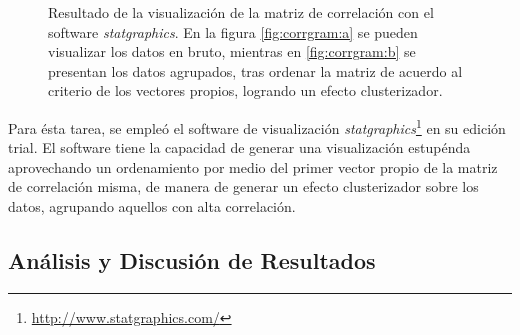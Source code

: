 \begin{figure}[h!]
	\centering
	\hspace*{\fill}
	\hfill
	\caption{Resultado de la visualización de la matriz de correlación con el software \emph{statgraphics}. En la figura \ref{fig:corrgram:a} se pueden visualizar los datos en bruto, mientras en \ref{fig:corrgram:b} se presentan los datos agrupados, tras ordenar la matriz de acuerdo al criterio de los vectores propios, logrando un efecto clusterizador.}
	\label{fig:corrmatrix}
	\hspace*{\fill}
\end{figure}

Para ésta tarea, se empleó el software de visualización \emph{statgraphics}\footnote{\url{http://www.statgraphics.com/}} en su edición trial. El software tiene la capacidad de generar una visualización estupénda aprovechando un ordenamiento por medio del primer vector propio de la matriz de correlación misma, de manera de generar un efecto clusterizador sobre los datos, agrupando aquellos con alta correlación.

\subsection{Análisis y Discusión de Resultados}

